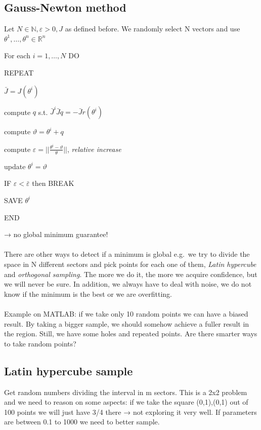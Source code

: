 \subsection{Gauss-Newton method}

Let $N \in \mathbb{N}, \varepsilon > 0, J$ as defined before. We randomly select N vectors and use
$\theta^1, \dots, \theta^n \in \mathbb{R}^n$

For each $i=1,\dots,N$ DO

REPEAT

$\bar{J}=J(\theta^i)$

compute $q$ s.t. $\bar{J}^i\bar{J}q=-\bar{J}r(\theta^i)$

compute $\vartheta = \theta^i + q$

compute $\varepsilon = ||\frac{\theta^i-\vartheta}{\theta}||$,
\emph{relative increase}

update $\theta^i = \vartheta$

IF $\varepsilon<\bar{\varepsilon}$ then BREAK

SAVE $\theta^i$

END

→ no global minimum guarantee!
\\
\\
\noindent
There are other ways to detect if a minimum is global e.g.~we try to
divide the space in N different sectors and pick points for each one of
them, \emph{Latin hypercube} and \emph{orthogonal sampling}. The more we
do it, the more we acquire confidence, but we will never be sure. In
addition, we always have to deal with noise, we do not know if the
minimum is the best or we are overfitting.
\\
\\
\noindent
Example on MATLAB: if we take only 10 random points we can have a biased
result. By taking a bigger sample, we should somehow achieve a fuller
result in the region. Still, we have some holes and repeated points. Are
there smarter ways to take random points?


\subsection{Latin hypercube sample}

Get random numbers dividing the interval in m sectors. This is a 2x2
problem and we need to reason on some aspects: if we take the square
(0,1),(0,1) out of 100 points we will just have 3/4 there → not
exploring it very well. If parameters are between 0.1 to 1000 we need to
better sample.

